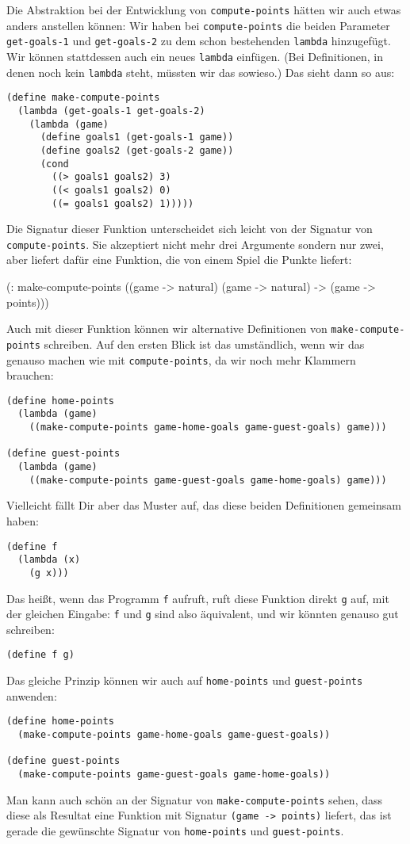 Die Abstraktion bei der Entwicklung von \lstinline{compute-points}
hätten wir auch etwas anders anstellen können: Wir haben bei
\lstinline{compute-points} die beiden Parameter
\lstinline{get-goals-1} und \lstinline{get-goals-2} zu dem schon
bestehenden \lstinline{lambda} hinzugefügt.  Wir können stattdessen
auch ein neues \lstinline{lambda} einfügen.  (Bei Definitionen, in
denen noch kein \lstinline{lambda} steht, müssten wir das sowieso.)
Das sieht dann so aus:
%
\begin{lstlisting}
(define make-compute-points
  (lambda (get-goals-1 get-goals-2)
    (lambda (game)
      (define goals1 (get-goals-1 game))
      (define goals2 (get-goals-2 game))
      (cond
        ((> goals1 goals2) 3)
        ((< goals1 goals2) 0)
        ((= goals1 goals2) 1)))))
\end{lstlisting}
%
Die Signatur dieser Funktion unterscheidet sich leicht von der
Signatur von \lstinline{compute-points}.  Sie akzeptiert nicht mehr drei
Argumente sondern nur zwei, aber liefert dafür eine Funktion, die von
einem Spiel die Punkte liefert:
%
\begin{lstinline}
(: make-compute-points ((game -> natural) (game -> natural) 
                         -> (game -> points)))
\end{lstinline}
%
Auch mit dieser Funktion können wir alternative Definitionen von
\lstinline{make-compute-points} schreiben.  Auf den ersten Blick ist
das umständlich, wenn wir das genauso machen wie mit
\lstinline{compute-points}, da wir noch mehr Klammern brauchen:
%
\begin{lstlisting}
(define home-points
  (lambda (game)
    ((make-compute-points game-home-goals game-guest-goals) game)))

(define guest-points
  (lambda (game)
    ((make-compute-points game-guest-goals game-home-goals) game)))
\end{lstlisting}
%
Vielleicht fällt Dir aber das Muster auf, das diese beiden
Definitionen gemeinsam haben:
%
\begin{lstlisting}
(define f
  (lambda (x)
    (g x)))
\end{lstlisting}
%
Das heißt, wenn das Programm \lstinline{f} aufruft, ruft diese
Funktion direkt \lstinline{g} auf, mit der gleichen Eingabe:
\lstinline{f} und \lstinline{g} sind also äquivalent, und wir könnten
genauso gut schreiben:
%
\begin{lstlisting}
(define f g)
\end{lstlisting}
%
Das gleiche Prinzip können wir auch auf \lstinline{home-points} und
\lstinline{guest-points} anwenden:
%
\begin{lstlisting}
(define home-points
  (make-compute-points game-home-goals game-guest-goals))

(define guest-points
  (make-compute-points game-guest-goals game-home-goals))
\end{lstlisting}
%
Man kann auch schön an der Signatur von
\lstinline{make-compute-points} sehen, dass diese als Resultat eine
Funktion mit Signatur \lstinline{(game -> points)} liefert, das ist
gerade die gewünschte Signatur von \lstinline{home-points} und
\lstinline{guest-points}.


